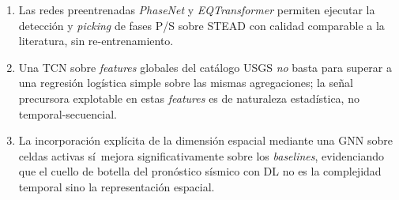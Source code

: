 \begin{enumerate}[label=\textbf{H\arabic*.}]
  \item Las redes preentrenadas \emph{PhaseNet} y \emph{EQTransformer} permiten ejecutar la detección y \textit{picking} de fases P/S sobre STEAD con calidad comparable a la literatura, sin re-entrenamiento.
  \item Una TCN sobre \textit{features} globales del catálogo USGS \emph{no} basta para superar a una regresión logística simple sobre las mismas agregaciones; la señal precursora explotable en estas \textit{features} es de naturaleza estadística, no temporal-secuencial.
  \item La incorporación explícita de la dimensión espacial mediante una GNN sobre celdas activas sí\, mejora significativamente sobre los \textit{baselines}, evidenciando que el cuello de botella del pronóstico sísmico con DL no es la complejidad temporal sino la representación espacial.
\end{enumerate}
